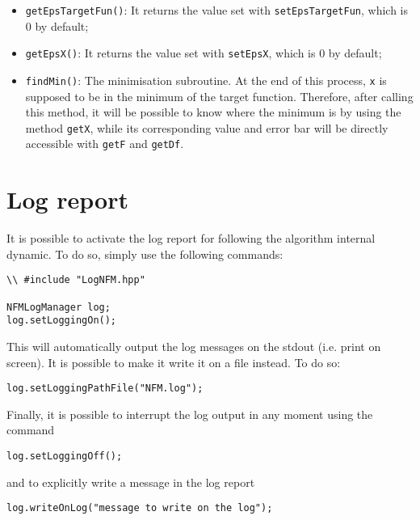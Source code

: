 \documentclass[11pt,a4paper,twoside]{article}
\begin{document}
\begin{itemize}
   \item \verb+getEpsTargetFun()+: It returns the value set with \verb+setEpsTargetFun+, which is $0$ by default;
   \item \verb+getEpsX()+: It returns the value set with \verb+setEpsX+, which is $0$ by default;
   \item \verb+findMin()+: The minimisation subroutine. At the end of this process, \verb+x+ is supposed to be in the minimum of the target function. Therefore, after calling this method, it will be possible to know where the minimum is by using the method \verb+getX+, while its corresponding value and error bar will be directly accessible with \verb+getF+ and \verb+getDf+.
\end{itemize}





\section{Log report} %
\label{sec:log_output}

It is possible to activate the log report for following the algorithm internal dynamic.
To do so, simply use the following commands:

\begin{lstlisting}
\\ #include "LogNFM.hpp"

NFMLogManager log;
log.setLoggingOn();
\end{lstlisting}

This will automatically output the log messages on the stdout (i.e. print on screen).
It is possible to make it write it on a file instead.
To do so:

\begin{lstlisting}
log.setLoggingPathFile("NFM.log");
\end{lstlisting}

Finally, it is possible to interrupt the log output in any moment using the command 
\begin{lstlisting}
log.setLoggingOff();
\end{lstlisting}
and to explicitly write a message in the log report
\begin{lstlisting}
log.writeOnLog("message to write on the log");
\end{lstlisting}

\end{document}
